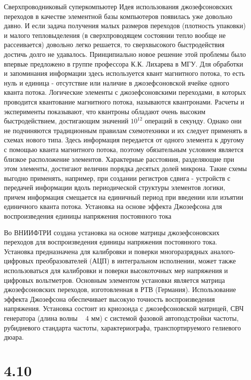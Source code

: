 \documentclass[a4paper,14pt]{article}
\begin{document}
Сверхпроводниковый суперкомпьютер
Идея использования джозефсоновских переходов в качестве элементной базы компьютеров появилась уже довольно давно. И если задача получения малых размеров переходов (плотность упаковки) и малого тепловыделения (в сверхпроводящем состоянии тепло вообще не рассеивается) довольно легко решается, то сверхвысокого быстродействия достичь долго не удавалось. 
Принципиально новое решение этой проблемы было впервые предложено в группе профессора К.К. Лихарева в МГУ. Для обработки и запоминания информации здесь используется квант магнитного потока, то есть нуль и единица - отсутствие или наличие в джозефсоновской ячейке одного кванта потока. Логические элементы с джозефсоновскими переходами, в которых проводится квантование магнитного потока, называются квантронами. Расчеты и эксперименты показывают, что квантроны обладают очень высоким быстродействием, достигающим значений $10^{12}$ операций в секунду. Однако они не подчиняются традиционным правилам схемотехники и их следует применять в схемах нового типа. Здесь информация передается от одного элемента к другому с помощью кванта магнитного потока, поэтому обязательным условием является близкое расположение элементов. Характерные расстояния, разделяющие при этом элементы, достигают величин порядка десятых долей микрона. Такие схемы выгодно применять, например, при создании регистров сдвига - устройств с передачей информации вдоль периодической структуры элементов логики, причем информация смещается на единичный период при введении или изъятии единичного кванта потока.
Установка на основе эффекта Джозефсона для воспроизведения единицы напряжения постоянного тока

Во ВНИИФТРИ создана установка на основе матрицы джозефсоновских переходов для воспроизведения единицы напряжения постоянного тока. 
Установка предназначена для калибровки и поверки многоразрядных аналого-цифровых преобразователей (АЦП) в интегральном исполнении, может также использоваться для калибровки и поверки высокоточных мер напряжения и цифровых вольтметров. 
Основным элементом установки является матрица джозефсоновских переходов, изготовленная в РТВ (Германия). Использование эффекта Джозефсона обеспечивает высокую точность воспроизведения напряжения. 
Установка состоит из криозонда с джозефсоновской матрицей, СВЧ генератора (длина волны ~ $4$ мм) с системой фазовой автоподстройки частоты, рубидиевого стандарта частоты, характериографа, транспортируемого гелиевого дюара. 

\section*{4.10}
\end{document}
